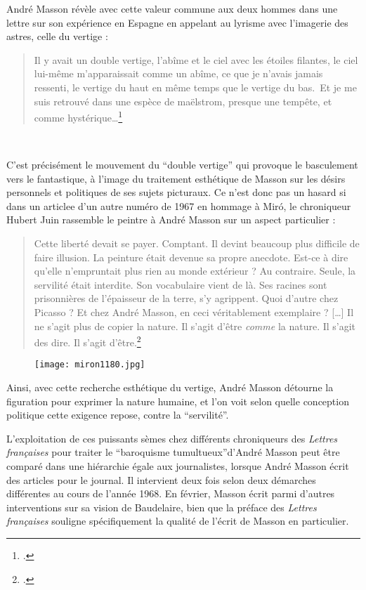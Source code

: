 André Masson révèle avec cette valeur commune aux deux hommes dans une lettre sur son expérience en Espagne en appelant au lyrisme avec l’imagerie des astres, celle du vertige : 
\begin{quote}
Il y avait un double vertige, l’abîme et le ciel avec les étoiles filantes, le ciel lui-même m’apparaissait comme un abîme, ce que je n’avais jamais ressenti, le vertige du haut en même temps que le vertige du bas. Et je me suis retrouvé dans une espèce de maëlstrom, presque une tempête, et comme hystérique…\footcite{mythologie}\end{quote}
 

	 C’est précisément le mouvement du \enquote{double vertige} qui provoque le basculement vers le fantastique, à l’image du traitement esthétique de Masson sur les désirs personnels et politiques de ses sujets picturaux. Ce n’est donc pas un hasard si dans un articlee d’un autre numéro de 1967 en hommage à Miró, le chroniqueur Hubert Juin rassemble le peintre à André Masson sur un aspect particulier : 
\begin{quote}
Cette liberté devait se payer. Comptant. Il devint beaucoup plus difficile de faire illusion. La peinture était devenue sa propre anecdote. Est-ce à dire qu’elle n’empruntait plus rien au monde extérieur ?  Au contraire. Seule, la servilité était interdite. Son vocabulaire vient de là. Ses racines sont prisonnières de l’épaisseur de la terre, s’y agrippent. Quoi d’autre chez Picasso ? Et chez André Masson, en ceci véritablement exemplaire ? […] Il ne s’agit plus de copier la nature. Il s’agit d’être \emph{comme} la nature. Il s’agit des dire. Il s’agit d’être.\footcite{joanmiro}\end{quote}	 


\begin{figure}[H]
   \centering
   \texttt{[image: miron1180.jpg]}
	\caption{\cite{joanmiro}}\label{fig:Miro}
\end{figure}

	Ainsi, avec cette recherche esthétique du vertige, André Masson détourne la figuration pour exprimer la nature humaine, et l’on voit selon quelle conception politique cette exigence repose, contre la \enquote{servilité}. 

	L’exploitation de ces puissants sèmes chez différents chroniqueurs des \emph{Lettres françaises} pour traiter le \enquote{baroquisme tumultueux}d’André Masson peut être comparé dans une hiérarchie égale aux journalistes, lorsque André Masson écrit des articles pour le journal. Il intervient deux fois selon deux démarches différentes au cours de l’année 1968. En février, Masson écrit parmi d’autres interventions sur sa vision de Baudelaire, bien que la préface des \emph{Lettres françaises} souligne spécifiquement la qualité de l’écrit de Masson en particulier. 

